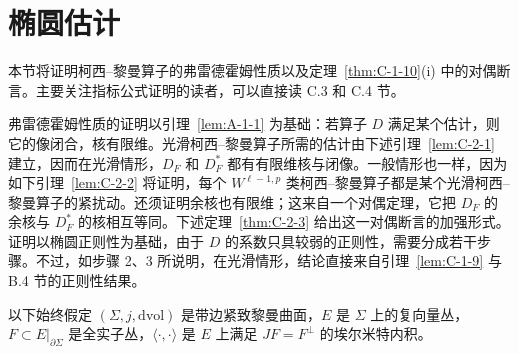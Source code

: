 
\section{椭圆估计}\label{sec:C-2}

本节将证明柯西–黎曼算子的弗雷德霍姆性质以及定理~\ref{thm:C-1-10}(i) 中的对偶断言。主要关注指标公式证明的读者，可以直接读 C.3 和 C.4 节。

弗雷德霍姆性质的证明以引理~\ref{lem:A-1-1} 为基础：若算子 $D$ 满足某个估计，则它的像闭合，核有限维。光滑柯西–黎曼算子所需的估计由下述引理~\ref{lem:C-2-1} 建立，因而在光滑情形，$D_F$ 和 $D_F^*$ 都有有限维核与闭像。一般情形也一样，因为如下引理~\ref{lem:C-2-2} 将证明，每个 $W^{\ell-1,p}$ 类柯西–黎曼算子都是某个光滑柯西–黎曼算子的紧扰动。还须证明余核也有限维；这来自一个对偶定理，它把 $D_F$ 的余核与 $D_F^*$ 的核相互等同。下述定理~\ref{thm:C-2-3} 给出这一对偶断言的加强形式。证明以椭圆正则性为基础，由于 $D$ 的系数只具较弱的正则性，需要分成若干步骤。不过，如步骤 2、3 所说明，在光滑情形，结论直接来自引理~\ref{lem:C-1-9} 与 B.4 节的正则性结果。

以下始终假定 $(\Sigma,j,\mathrm{dvol})$ 是带边紧致黎曼曲面，$E$ 是 $\Sigma$ 上的复向量丛，$F\subset E|_{\partial\Sigma}$ 是全实子丛，$\langle\cdot,\cdot\rangle$ 是 $E$ 上满足 $JF=F^\perp$ 的埃尔米特内积。

